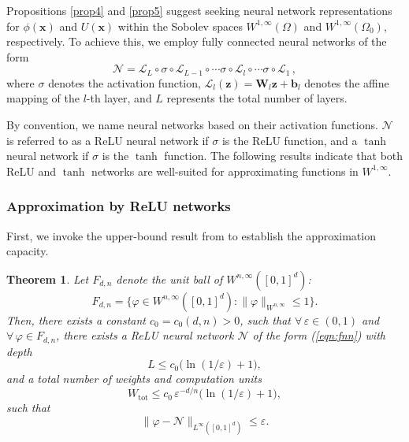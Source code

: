 \documentclass[final,hidelinks,onefignum,onetabnum]{siamart251216}
\newtheorem{thm}{Theorem}[section]
\begin{document}
Propositions \ref{prop4} and \ref{prop5} suggest seeking neural network representations for $\phi(\mathbf{x})$ and $U(\mathbf{x})$ within the Sobolev spaces $W^{1,\infty}(\Omega)$ and $W^{1,\infty}(\Omega_0)$, respectively. To achieve this, we employ fully connected neural networks of the form 
\begin{equation} \label{eqn:fnn}
	\mathcal{N}= \mathcal{L}_L\circ\sigma\circ\mathcal{L}_{L-1}\circ \cdots \sigma\circ\mathcal{L}_l\circ \cdots \sigma \circ\mathcal{L}_1\,,
\end{equation}
where $\sigma$ denotes the activation function, $\mathcal{L}_l(\mathbf{z})=\mathbf{W}_l\mathbf{z}+\mathbf{b}_l$ denotes the affine mapping of the $l$-th layer, and $L$ represents the total number of layers. 

By convention, we name neural networks based on their activation functions. $\mathcal{N}$ is referred to as a ReLU neural network if $\sigma$ is the ReLU function, and a $\tanh$ neural network if $\sigma$ is the $\tanh$ function. The following results \cite{yar17, zhaluzha24} indicate that both ReLU and $\tanh$ networks are well-suited for approximating functions in $W^{1,\infty}$.

\subsubsection{Approximation by ReLU networks} \label{subsubsec3.5.1}
First, we invoke the upper-bound result from \cite{yar17} to establish the approximation capacity.
\begin{thm}\cite[Theorem~1]{yar17}\label{prop:relu_bounds_en}
	Let $F_{d,n}$ denote the unit ball of $W^{n,\infty}([0,1]^d)$:
	\[
		F_{d,n}=\bigl\{\varphi\in W^{n,\infty}([0,1]^d):\|\varphi\|_{W^{n,\infty}}\le1\bigr\}.
	\]
	Then, there exists a constant $c_{0}=c_{0}(d,n)>0$, such that $\forall\,\varepsilon\in(0,1)$ and $\forall\,\varphi\in F_{d,n}$, there exists a ReLU neural network $\mathcal{N}$ of the form (\ref{eqn:fnn}) with depth
	\begin{equation} \label{eqn:relu_depth}
		L\le c_{0}\bigl(\ln(1/\varepsilon)+1\bigr),
	\end{equation}
	and a total number of weights and computation units
	\begin{equation} \label{eqn:relu_weight_upper}
		W_{\mathrm{tot}}\le c_{0}\,\varepsilon^{-d/n}\bigl(\ln(1/\varepsilon)+1\bigr),
	\end{equation}
	such that
	\begin{equation} \label{eqn:relu_approx}
		\|\varphi-\mathcal{N}\|_{L^\infty([0,1]^d)}\le\varepsilon.
	\end{equation}
\end{thm}
\end{document}
